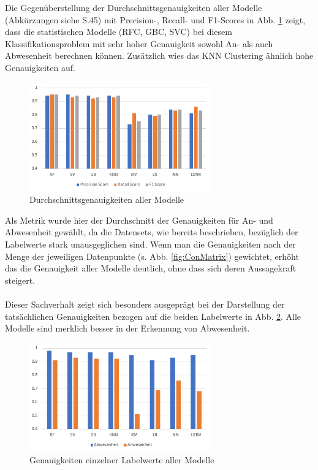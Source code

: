 \newpage

Die Gegenüberstellung der Durchschnittsgenauigkeiten aller Modelle (Abkürzungen siehe S.45) mit Precision-, Recall- und F1-Scores in 
Abb. \ref{fig:ResAll}  zeigt, dass die statistischen Modelle (RFC, GBC, SVC) bei diesem Klassifikationsproblem mit sehr hoher
Genauigkeit sowohl An- als auch Abwesenheit berechnen können. Zusätzlich wies das KNN Clustering ähnlich
hohe Genauigkeiten auf.
\begin{figure}[h]
    \centering
    \includegraphics[width=0.7\textwidth]{pic/results_all.png}
    \caption{Durchschnittsgenauigkeiten aller Modelle}
    \label{fig:ResAll}
\end{figure}

Als Metrik wurde hier der Durchschnitt der Genauigkeiten für An- und Abwesenheit gewählt, da die 
Datensets, wie bereits beschrieben, bezüglich der Labelwerte stark unausgeglichen sind. Wenn man die Genauigkeiten
nach der Menge der jeweiligen Datenpunkte (s. Abb. \ref{fig:ConMatrix}) gewichtet, erhöht das die Genauigkeit 
aller Modelle deutlich, ohne dass sich deren Aussagekraft steigert.\\\\ 
Dieser Sachverhalt zeigt sich besonders ausgeprägt bei der Darstellung der tatsächlichen Genauigkeiten bezogen 
auf die beiden Labelwerte in Abb. \ref{fig:ResSpec}. Alle Modelle sind merklich besser in der Erkennung von 
Abwesenheit.

\begin{figure}[h]
    \centering
    \includegraphics[width=0.7\textwidth]{pic/results_spec.png}
    \caption{Genauigkeiten einzelner Labelwerte aller Modelle}
    \label{fig:ResSpec}
\end{figure}


